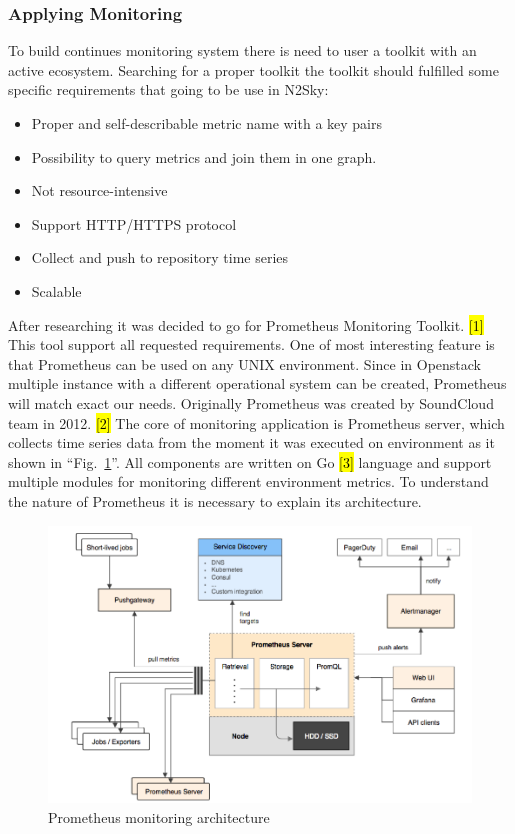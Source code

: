 \subsubsection{Applying Monitoring}\label{Applying Monitoring}
To build continues monitoring system there is need to user a toolkit with an active ecosystem.  Searching for a proper toolkit the toolkit should fulfilled some specific requirements that going to be use in N2Sky:
\begin{itemize}
\item Proper and self-describable metric name with a key pairs
\item Possibility to query metrics and join them in one graph.
\item Not resource-intensive
\item Support HTTP/HTTPS protocol
\item Collect and push to repository time series
\item Scalable
\end{itemize}

After researching it was decided to go for Prometheus Monitoring Toolkit. \hl{[1]} This tool support all requested requirements. One of most interesting feature is that Prometheus can be used on any UNIX environment. Since in Openstack multiple instance with a different operational system can be created, Prometheus will match exact our needs. 
Originally Prometheus was created by SoundCloud team in 2012. \hl{[2]} The core of monitoring application is Prometheus server, which collects time series data from the moment it was executed on environment as it shown in ``Fig.~\ref{fig:prometherus_arch}''. All components are written on Go \hl{[3]} language and support multiple modules for monitoring different environment metrics. 
To understand the nature of Prometheus it is necessary to explain its architecture. 

\begin{figure}[htbp]
\begin{center}
  \includegraphics[width=\linewidth]{components/3/prometherus_arch.png}
  \caption{Prometheus monitoring architecture}
  \label{fig:prometherus_arch}
\end{center}
\end{figure}

